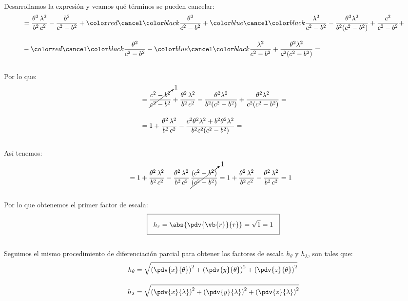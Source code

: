 \\
Desarrollamos la expresión y veamos qué términos se pueden cancelar:
\begin{align*}
&= \dfrac{\theta^{2} \, \lambda^{2}}{b^{2} \, c^{2}} - \dfrac{b^{2}}{c^{2} - b^{2}} + \Cancel[red]{\dfrac{\theta^{2}}{c^{2} - b^{2}}} + \Cancel[blue]{\dfrac{\lambda^{2}}{c^{2} - b^{2}}} - \dfrac{\theta^{2} \lambda^{2}}{b^{2} (c^{2} - b^{2})} + \dfrac{c^{2}}{c^{2} - b^{2}} + \\[1em]
&- \Cancel[red]{\dfrac{\theta^{2}}{c^{2} - b^{2}}} - \Cancel[blue]{\dfrac{\lambda^{2}}{c^{2} - b^{2}}} + \dfrac{\theta^{2} \lambda^{2}}{c^{2} (c^{2} - b^{2})} = 
\end{align*}
\\
Por lo que:
\begin{align*}
&= \cancelto{1}{\dfrac{c^{2} - b^{2}}{c^{2} - b^{2}}} + \dfrac{\theta^{2} \, \lambda^{2}}{b^{2} \, c^{2}} - \dfrac{\theta^{2} \lambda^{2}}{b^{2} (c^{2} - b^{2})} + \dfrac{\theta^{2} \lambda^{2}}{c^{2} (c^{2} - b^{2})} = \\[1em] 
&= 1 + \dfrac{\theta^{2} \, \lambda^{2}}{b^{2} \, c^{2}} - \dfrac{c^{2} \theta^{2} \lambda^{2} + b^{2} \theta^{2} \lambda^{2}}{b^{2} c^{2} (c^{2} - b^{2})} = 
\end{align*}
\\
Así tenemos:
\begin{align*}
&= 1 + \dfrac{\theta^{2} \, \lambda^{2}}{b^{2} \, c^{2}} - \dfrac{\theta^{2} \, \lambda^{2}}{b^{2} \, c^{2}} \, \cancelto{1}{\dfrac{(c^{2} - b^{2})}{(c^{2} - b^{2})}} = 1 + \dfrac{\theta^{2} \, \lambda^{2}}{b^{2} \, c^{2}} - \dfrac{\theta^{2} \, \lambda^{2}}{b^{2} \, c^{2}} =  1
\end{align*}
\\
Por lo que obtenemos el primer factor de escala:
\begin{align*}
\setlength{\fboxsep}{3\fboxsep}\boxed{h_{r} = \abs{\pdv{\vb{r}}{r}} = \sqrt{1} = 1}
\end{align*}
\\
Seguimos el mismo procedimiento de diferenciación parcial para obtener los factores de escala $h_{\theta}$ y $h_{\lambda}$, son tales que:
\begin{align*}
h_{\theta} &= \sqrt{\left( \pdv{x}{\theta} \right)^{2} + \left( \pdv{y}{\theta} \right)^{2} + \left( \pdv{z}{\theta} \right)^{2}} \\[1em]
h_{\lambda} &= \sqrt{\left( \pdv{x}{\lambda} \right)^{2} + \left( \pdv{y}{\lambda} \right)^{2} + \left( \pdv{z}{\lambda} \right)^{2}} \\[1em]
\end{align*}
